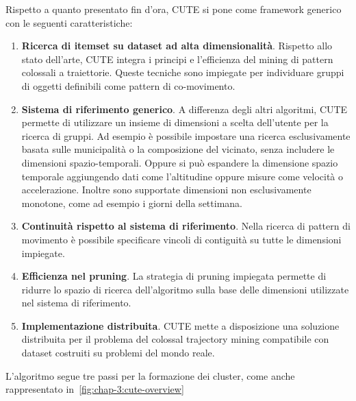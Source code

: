 Rispetto a quanto presentato fin d'ora, CUTE si pone come framework generico con le seguenti caratteristiche:

\begin{enumerate}
 \item \textbf{Ricerca di itemset su dataset ad alta dimensionalità}. Rispetto allo stato dell'arte, CUTE integra i principi e l'efficienza del
 mining di pattern colossali a traiettorie.
 Queste tecniche sono impiegate per individuare gruppi di oggetti definibili come pattern di co-movimento.
 
  \item \textbf{Sistema di riferimento generico}. A differenza degli altri algoritmi, 
  CUTE permette di utilizzare un insieme di dimensioni a scelta dell'utente per la ricerca di gruppi.
  Ad esempio è possibile impostare una ricerca esclusivamente basata sulle municipalità o la composizione del vicinato, senza includere 
  le dimensioni spazio-temporali.
  Oppure si può espandere la dimensione spazio temporale aggiungendo dati come l'altitudine oppure misure come velocità o accelerazione.
  Inoltre sono supportate dimensioni non esclusivamente monotone, come ad esempio i giorni della settimana.

  \item \textbf{Continuità rispetto al sistema di riferimento}. Nella ricerca di pattern di movimento è possibile specificare vincoli di contiguità su tutte le dimensioni impiegate.

  \item \textbf{Efficienza nel pruning}. La strategia di pruning impiegata permette di ridurre
  lo spazio di ricerca dell'algoritmo sulla base delle dimensioni utilizzate nel sistema di riferimento.

  \item \textbf{Implementazione distribuita}. CUTE mette a disposizione una soluzione distribuita per il problema del colossal trajectory mining compatibile con dataset costruiti su problemi del mondo reale.
\end{enumerate}



L'algoritmo segue tre passi per la formazione dei cluster, come anche rappresentato in~\cref{fig:chap-3:cute-overview}

